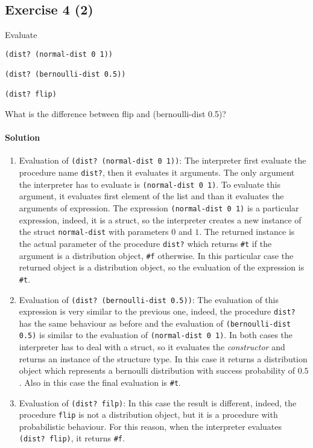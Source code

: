 \subsection*{Exercise 4 (2)}
Evaluate
\begin{lstlisting}
(dist? (normal-dist 0 1))
    
(dist? (bernoulli-dist 0.5))

(dist? flip)
\end{lstlisting}
What is the difference between flip and (bernoulli-dist 0.5)?

\paragraph{Solution}
\begin{enumerate}
    \item Evaluation of \texttt{(dist? (normal-dist 0 1))}: The interpreter first evaluate the procedure name \texttt{dist?}, then
        it evaluates it arguments. The only argument the interpreter has to evaluate is \texttt{(normal-dist 0 1)}. To evaluate
        this argument, it evaluates first element of the list and than it evaluates the arguments of expression.
        The expression \texttt{(normal-dist 0 1)} is a particular expression, indeed, it is a struct, so the interpreter creates a
        new instance of the struct \texttt{normal-dist} with parameters $0$ and $1$. The returned instance is the actual parameter
        of the procedure \texttt{dist?} which returns \texttt{\#t} if the argument is a distribution object, \texttt{\#f}
        otherwise. In this particular case the returned object is a distribution object, so the evaluation of the expression is 
        \texttt{\#t}.
    \item Evaluation of \texttt{(dist? (bernoulli-dist 0.5))}: The evaluation of this expression is very similar to the previous
        one, indeed, the procedure \texttt{dist?} has the same behaviour as before and the evaluation of \texttt{(bernoulli-dist 0.5)}
        is similar to the evaluation of \texttt{(normal-dist 0 1)}.
        In both cases the interpreter has to deal with a struct, so it evaluates the \textit{constructor} and returns an instance
        of the structure type. In this case it returns a distribution object which represents a bernoulli distribution with success
        probability of $0.5$.
        Also in this case the final evaluation is \texttt{\#t}.
    \item Evaluation of \texttt{(dist? filp)}: In this case the result is different, indeed, the procedure \texttt{flip} is not a 
        distribution object, but it is a procedure with probabilistic behaviour. For this reason, when the interpreter evaluates
        \texttt{(dist? flip)}, it returns \texttt{\#f}.
\end{enumerate}

